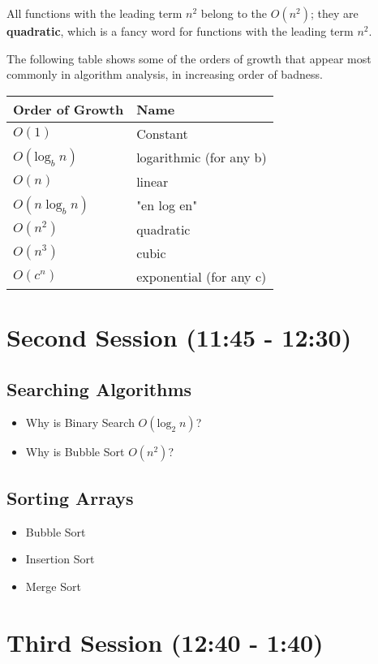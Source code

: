 \documentclass[11pt]{article}
\begin{document}
All functions with the leading term $n^2$ belong to the $O(n^2)$;
they are \textbf{quadratic}, which is a fancy word for functions with
the leading term $n^2$.

The following table shows some of the orders of growth that appear most commonly
in algorithm analysis, in increasing order of badness.

\begin{center}
\begin{tabular}{ll}
Order of Growth & Name\\
\hline
$O(1)$ & Constant\\
$O(\mathrm{log}_b \; n)$ & logarithmic (for any b)\\
$O(n)$ & linear\\
$O(n \; \mathrm{log}_b \; n)$ & "en log en"\\
$O(n^2)$ & quadratic\\
$O(n^3)$ & cubic\\
$O(c^n)$ & exponential (for any c)\\
\end{tabular}
\end{center}
\section{Second Session (11:45 - 12:30)}
\label{sec-2}
\subsection{Searching Algorithms}
\label{sec-2-1}
\begin{itemize}
\item Why is Binary Search $O(\mathrm{log}_2 \; n)$?
\item Why is Bubble Sort $O(n^2)$?
\end{itemize}
\subsection{Sorting Arrays}
\label{sec-2-2}
\begin{itemize}
\item Bubble Sort
\item Insertion Sort
\item Merge Sort
\end{itemize}

\section{Third Session (12:40 - 1:40)}
\label{sec-3}
\end{document}
